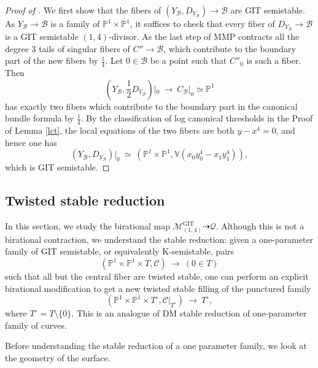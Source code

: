 \documentclass[a4paper,12pt]{amsart}
\newcommand{\mtc}[1]{\mathcal{#1}}
\newcommand{\mts}[1]{\mathscr{#1}}
\newcommand{\cQ}{\mathcal{Q}}
\DeclareMathOperator{\GIT}{GIT}
\newcommand{\bV}{{\mathbb V}}
\newcommand{\bP}{{\mathbb P}}
\newcommand{\sB}{{\mathscr{B}}}
\theoremstyle{definition}
\theoremstyle{remark}
\begin{document}
\begin{proof}[Proof of ]
   We first show that the fibers of $(Y_{\sB},D_{Y_{\sB}})\rightarrow \sB$ are GIT semistable. As $Y_{\sB}\rightarrow \sB$ is a family of $\bP^1\times \bP^1$, it suffices to check that every fiber of $D_{Y_{\sB}}\rightarrow \sB$ is a GIT semistable $(1,4)$-divisor. As the last step of MMP contracts all the degree $3$ tails of singular fibers of $C''\rightarrow \sB$, which contribute to the boundary part of the new fibers by $\frac{1}{4}$. Let $0\in \sB$ be a point such that $C''_0$ is such a fiber. Then $$\textstyle (Y_{\sB},\frac{1}{2}D_{Y_{\sB}})|_{0} \ \longrightarrow \ C_{\sB}|_{0}\simeq \bP^1$$ has exactly two fibers which contribute to the boundary part in the canonical bundle formula by $\frac{1}{4}$. By the classification of log canonical thresholds in the Proof of Lemma \ref{lct}, the local equations of the two fibers are both $y-x^4=0$, and hence one has $$(Y_{\sB},D_{Y_{\sB}})|_{0} \ \simeq \ (\bP^1\times\bP^1,\bV(x_0y_0^4-x_1y_1^4)),$$ which is GIT semistable.
\end{proof}






\subsection{Twisted stable reduction}\label{sec:twisted stable reduction}

In this section, we study the birational map $\mtc{M}^{\GIT}_{(1,4)}\dashrightarrow \cQ$. Although this is not a birational contraction, we understand the stable reduction: given a one-parameter family of GIT semistable, or equivalently K-semistable, pairs $$(\bP^1\times\bP^1\times T,\mts{C})\ \longrightarrow \ (0\in T)$$ such that all but the central fiber are twisted stable, one can perform an explicit birational modification to get a new twisted stable filling of the punctured family $$(\bP^1\times\bP^1\times T^{\circ},\mts{C}|_{T^{\circ}}) \ \longrightarrow  \ T^{\circ},$$ where $T^{\circ}= T\setminus\{0\}$. This is an analogue of DM stable reduction of one-parameter family of curves.

Before understanding the stable reduction of a one parameter family, we look at the geometry of the surface.
\end{document}
